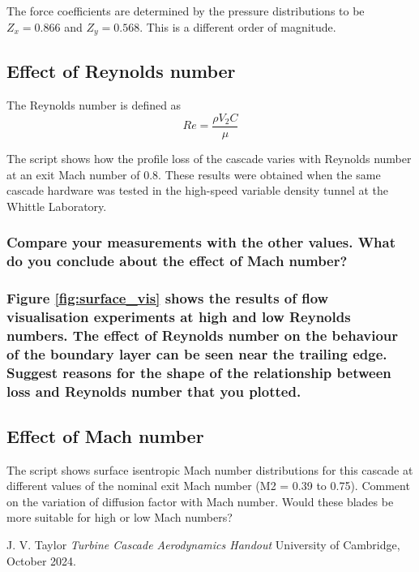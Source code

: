 \documentclass{article}
\begin{document}
The force coefficients are determined by the pressure distributions to be $Z_x = 0.866$ and $Z_y = 0.568$.
This is a different order of magnitude. %

\subsection{Effect of Reynolds number}

The Reynolds number is defined as
\begin{equation}
    Re = \frac{\rho V_2 C}{\mu}
\end{equation}

The script shows how the profile loss of the cascade varies with Reynolds number at an exit
Mach number of 0.8. These results were obtained when the same cascade hardware was tested
in the high-speed variable density tunnel at the Whittle Laboratory.

\subsubsection{Compare your measurements with the other values. What do you conclude about the
effect of Mach number?}


\subsubsection{Figure \ref{fig:surface_vis} shows the results of flow visualisation experiments at high and low Reynolds
numbers. The effect of Reynolds number on the behaviour of the boundary layer can be seen
near the trailing edge. Suggest reasons for the shape of the relationship between loss and
Reynolds number that you plotted.}



\subsection{Effect of Mach number}
The script shows surface isentropic Mach number distributions for this cascade at different
values of the nominal exit Mach number (M2 = 0.39 to 0.75). Comment on the variation of
diffusion factor with Mach number. Would these blades be more suitable for high or low Mach
numbers?



\begin{thebibliography}{9}


  J. V. Taylor
  \emph{Turbine Cascade Aerodynamics Handout}
  University of Cambridge,
  October 2024.

\end{thebibliography}
\end{document}
